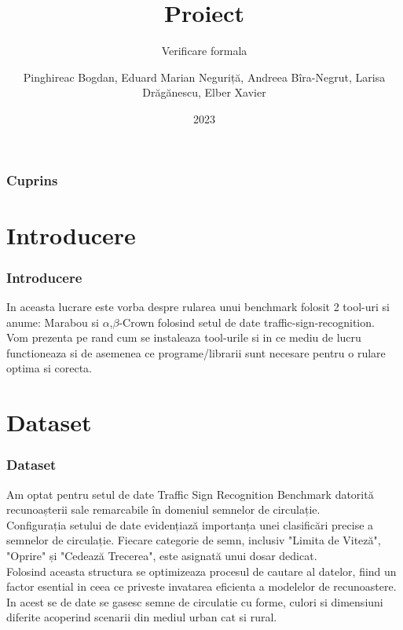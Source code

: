 \documentclass{beamer}
\title[Verificare formala] %
{Proiect}
\subtitle{Verificare formala}
\author[] %
{Pinghireac Bogdan, Eduard Marian Neguriță, Andreea Bîra-Negrut, Larisa Drăgănescu, Elber Xavier}
\institute[UVT] %
{
  \inst{1}%
  UNIVERSITATEA DE VEST DIN TIMI\c SOARA
  \and
  \inst{2}%
  FACULTATEA DE MATEMATIC\u A \c SI INFORMATIC\u A
}
\date[2023] %
{2023}
\newcommand\tab[1][1cm]{\hspace*{#1}}
\begin{document}
\frame{\titlepage}


\begin{frame}
\frametitle{Cuprins}
\tableofcontents
\end{frame}


\section{Introducere}

\begin{frame}
\frametitle{Introducere}
\tab In aceasta lucrare este vorba despre rularea unui benchmark folosit 2 tool-uri si anume: Marabou si $\alpha$,$\beta$-Crown folosind setul de date traffic-sign-recognition. \\
\tab Vom prezenta pe rand cum se instaleaza tool-urile si in ce mediu de lucru functioneaza si de asemenea ce programe/librarii sunt necesare pentru o rulare optima si corecta. \\

\end{frame}



\section{Dataset}

\begin{frame}
\frametitle{Dataset}
\tab Am optat pentru setul de date Traffic Sign Recognition Benchmark datorită recunoașterii sale remarcabile în domeniul semnelor de circulație. \\
\tab Configurația setului de date evidențiază importanța unei clasificări precise a semnelor de circulație. Fiecare categorie de semn, inclusiv "Limita de Viteză", "Oprire" și "Cedează Trecerea", este asignată unui dosar dedicat. \\
\tab Folosind aceasta structura se optimizeaza procesul de cautare al datelor, fiind un factor esential in ceea ce priveste invatarea eficienta a modelelor de recunoastere. In acest se de date se gasesc semne de circulatie cu forme, culori si dimensiuni diferite acoperind scenarii din mediul urban cat si rural.
\end{frame}
\end{document}
